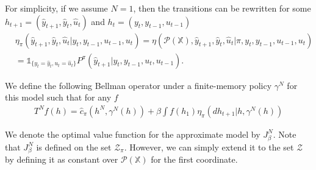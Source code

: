 \documentclass[11pt]{article}
\def\P{{\mathcal P}}
\begin{document}
For simplicity, if we assume $N=1$, then the transitions can be rewritten for some $h_{t+1}=(\hat{y}_{t+1},\hat{y}_t,\hat{u}_t)$ and $h_t=(y_t,y_{t-1},u_{t-1})$
\begin{align}\label{alt_eta_N}
&{\eta}_\pi(\hat{y}_{t+1},\hat{y}_t,\hat{u}_t|y_t,y_{t-1},u_{t-1},u_t)={\eta}(\P(\mathds{X}),\hat{y}_{t+1},\hat{y}_t,\hat{u}_t|\pi,y_t,y_{t-1},u_{t-1},u_t)\nonumber\\
&=\mathds{1}_{\{y_t=\hat{y}_t,u_t=\hat{u}_t\}}P^{\pi}(\hat{y}_{t+1}|y_t,y_{t-1},u_t,u_{t-1}).
\end{align} 

We define the following Bellman operator under a finite-memory policy $\gamma^N$ for this model such that for any $f$
\begin{align}\label{fin_mem_Bellman}
T^N f(h)= \hat{c}_\pi(h^N,\gamma^N(h))+ \beta \int f(h_1)\eta_\pi(dh_{t+1}|h,\gamma^N(h))
\end{align}





We denote the optimal value function for the approximate model by $J_\beta^N$. %
Note that $J^N_\beta$ is defined on the set ${\mathcal{Z}}_{\pi}$. However, we can simply extend it to the set ${\mathcal{Z}}$ by defining it as constant over $\P(\mathds{X})$ for the first coordinate.  %
\end{document}
